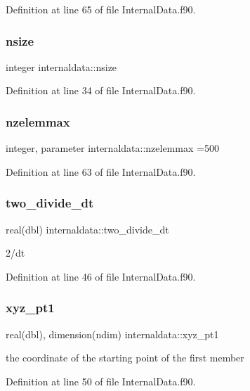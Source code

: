 Definition at line 65 of file Internal\+Data.\+f90.

\mbox{\label{namespaceinternaldata_a870ff06e13dc622293c20b2cc20641b9}} 
\subsubsection{\texorpdfstring{nsize}{nsize}}
{\footnotesize\ttfamily integer internaldata\+::nsize}



Definition at line 34 of file Internal\+Data.\+f90.

\mbox{\label{namespaceinternaldata_ac1eede24bc6cba1bdab331c6ad695fcc}} 
\subsubsection{\texorpdfstring{nzelemmax}{nzelemmax}}
{\footnotesize\ttfamily integer, parameter internaldata\+::nzelemmax =500}



Definition at line 63 of file Internal\+Data.\+f90.

\mbox{\label{namespaceinternaldata_a6c7ccd03dc69209443b0d6756c26f43a}} 
\subsubsection{\texorpdfstring{two\+\_\+divide\+\_\+dt}{two\_divide\_dt}}
{\footnotesize\ttfamily real(dbl) internaldata\+::two\+\_\+divide\+\_\+dt}



2/dt 



Definition at line 46 of file Internal\+Data.\+f90.

\mbox{\label{namespaceinternaldata_a9ea25e6f8fbdc09124cc1002446ffcfc}} 
\subsubsection{\texorpdfstring{xyz\+\_\+pt1}{xyz\_pt1}}
{\footnotesize\ttfamily real(dbl), dimension(ndim) internaldata\+::xyz\+\_\+pt1}



the coordinate of the starting point of the first member 



Definition at line 50 of file Internal\+Data.\+f90.

